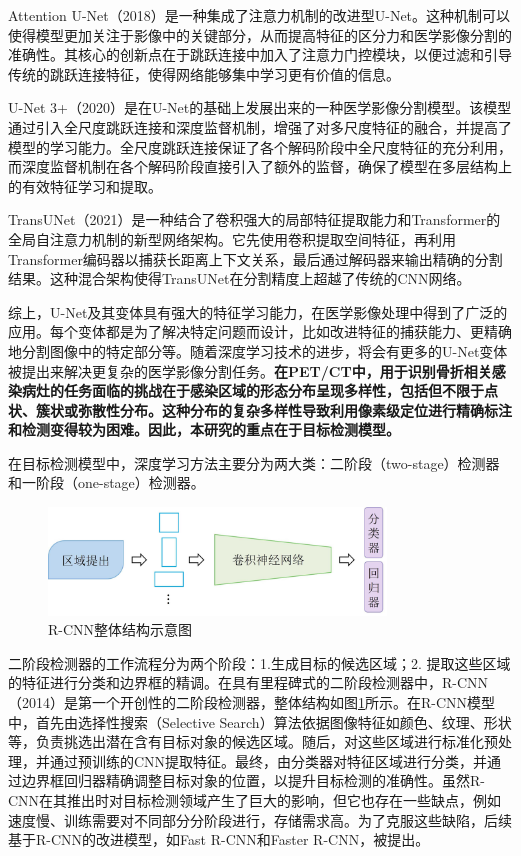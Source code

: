 Attention U-Net\cite{oktay2018attention}（2018）是一种集成了注意力机制的改进型U-Net\cite{ronneberger2015u}。这种机制可以使得模型更加关注于影像中的关键部分，从而提高特征的区分力和医学影像分割的准确性。其核心的创新点在于跳跃连接中加入了注意力门控模块，以便过滤和引导传统的跳跃连接特征，使得网络能够集中学习更有价值的信息。

U-Net 3+\cite{huang2020unet}（2020）是在U-Net的基础上发展出来的一种医学影像分割模型。该模型通过引入全尺度跳跃连接和深度监督机制，增强了对多尺度特征的融合，并提高了模型的学习能力。全尺度跳跃连接保证了各个解码阶段中全尺度特征的充分利用，而深度监督机制在各个解码阶段直接引入了额外的监督，确保了模型在多层结构上的有效特征学习和提取。

TransUNet\cite{chen2021transunet}（2021）是一种结合了卷积强大的局部特征提取能力和Transformer的全局自注意力机制的新型网络架构。它先使用卷积提取空间特征，再利用Transformer编码器以捕获长距离上下文关系，最后通过解码器来输出精确的分割结果。这种混合架构使得TransUNet在分割精度上超越了传统的CNN网络。

综上，U-Net及其变体具有强大的特征学习能力，在医学影像处理中得到了广泛的应用。每个变体都是为了解决特定问题而设计，比如改进特征的捕获能力、更精确地分割图像中的特定部分等。随着深度学习技术的进步，将会有更多的U-Net变体被提出来解决更复杂的医学影像分割任务。\textbf{在PET/CT中，用于识别骨折相关感染病灶的任务面临的挑战在于感染区域的形态分布呈现多样性，包括但不限于点状、簇状或弥散性分布。这种分布的复杂多样性导致利用像素级定位进行精确标注和检测变得较为困难。因此，本研究的重点在于目标检测模型。}

在目标检测模型中，深度学习方法主要分为两大类：二阶段（two-stage）检测器和一阶段（one-stage）检测器。

\begin{figure}[htbp]
  \centering
  \includegraphics[width=0.8\textwidth]{figures/chap02_rcnn.jpg}
  \caption{R-CNN整体结构示意图}
  \label{fig:chap02_rcnn}
\end{figure}

二阶段检测器的工作流程分为两个阶段：1.生成目标的候选区域；2. 提取这些区域的特征进行分类和边界框的精调。在具有里程碑式的二阶段检测器中，R-CNN\cite{girshick2014rich}（2014）是第一个开创性的二阶段检测器，整体结构如图\ref{fig:chap02_rcnn}所示。在R-CNN模型中，首先由选择性搜索（Selective Search）算法依据图像特征如颜色、纹理、形状等，负责挑选出潜在含有目标对象的候选区域。随后，对这些区域进行标准化预处理，并通过预训练的CNN提取特征。最终，由分类器对特征区域进行分类，并通过边界框回归器精确调整目标对象的位置，以提升目标检测的准确性。虽然R-CNN在其推出时对目标检测领域产生了巨大的影响，但它也存在一些缺点，例如速度慢、训练需要对不同部分分阶段进行，存储需求高。为了克服这些缺陷，后续基于R-CNN的改进模型，如Fast R-CNN\cite{girshick2015fast}和Faster R-CNN\cite{ren2015faster}，被提出。

